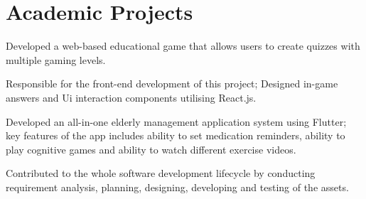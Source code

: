 \documentclass[]{deedy-resume}
\begin{document}
\begin{minipage}[t]{0.66\textwidth}
\begin{tightemize}
\end{tightemize}
\sectionsep


\section{Academic Projects}
\begin{tightemize}
\item Developed a web-based educational game that allows users to create quizzes with multiple gaming levels.
\item Responsible for the front-end development of this project; Designed in-game answers and Ui interaction components utilising React.js. 
\end{tightemize}
\sectionsep

\begin{tightemize}
\item Developed an all-in-one elderly management application system using Flutter; key features of the app includes ability to set medication reminders, ability to play cognitive games and ability to watch different exercise videos.
\item Contributed to the whole software development lifecycle by conducting requirement analysis, planning, designing, developing and testing of the assets.
\end{tightemize}
\sectionsep




\end{minipage}
\end{document}
